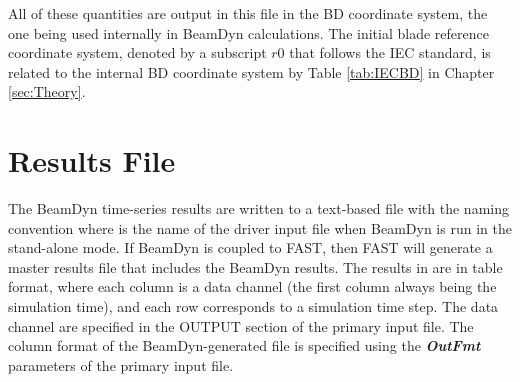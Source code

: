 All of these quantities are output in this file in the BD coordinate system, the one being used internally in BeamDyn calculations. 
The initial blade reference coordinate system, denoted by a subscript $r0$ that follows the IEC standard, is related to the internal BD coordinate system by Table \ref{tab:IECBD} in Chapter \ref{sec:Theory}. 

\section{Results File}

The BeamDyn time-series results are written to a text-based file with the naming convention 
 where  is the name of the driver input file when BeamDyn is run in the stand-alone mode. 
If BeamDyn is coupled to FAST, then FAST will generate a master results file that includes the BeamDyn results. 
The results in  are in table format, where each column is a data channel (the first column always being the simulation time), and each row corresponds to a simulation time step. 
The data channel are specified in the OUTPUT section of the primary input file. 
The column format of the BeamDyn-generated file is specified using the  \textbf{\textit{OutFmt}} parameters of the primary input file. 

